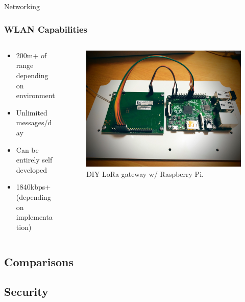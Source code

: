\documentclass{beamer}
\begin{document}
  \begin{frame}{Networking}
    \frametitle{WLAN Capabilities}
    \begin{columns}
      \begin{column}{0.5\textwidth}
        \begin{itemize}
          \item 200m+ of range depending on environment
          \item Unlimited messages/day
          \item Can be entirely self developed
          \item 1840kbps+ (depending on implementation)
        \end{itemize}
      \end{column}
      \begin{column}{0.5\textwidth}
        \begin{figure}[htbp]
          \centering
          \includegraphics[width=\textwidth]{DIYloraGateway.jpg}
          \caption{DIY LoRa gateway w/ Raspberry Pi.\cite{DIYLoRa}}
          \label{fig:DIY_LoRa_Gateway}
        \end{figure}
      \end{column}
    \end{columns}
  \end{frame}

\subsection{Comparisons}
\subsection{Security}
\end{document}
